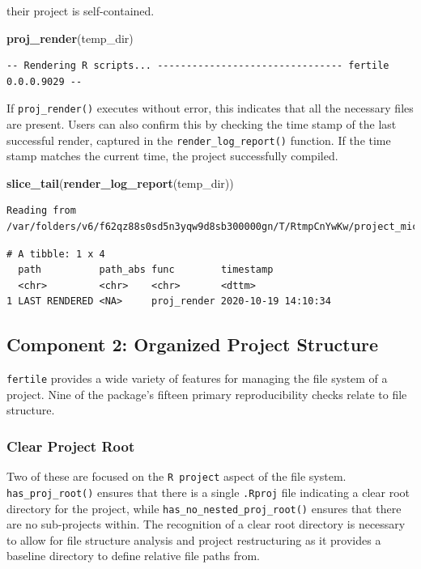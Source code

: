 \documentclass[12pt,twoside]{reedthesis}
\newenvironment{Shaded}{\begin{snugshade}}{\end{snugshade}}
\newcommand{\KeywordTok}[1]{\textcolor[rgb]{0.13,0.29,0.53}{\textbf{#1}}}
\newcommand{\NormalTok}[1]{#1}
\begin{document}
their project is self-contained.
\begin{Shaded}
\begin{Highlighting}[]
\KeywordTok{proj_render}\NormalTok{(temp_dir)}
\end{Highlighting}
\end{Shaded}
\begin{verbatim}
-- Rendering R scripts... -------------------------------- fertile 0.0.0.9029 --
\end{verbatim}
If \texttt{proj\_render()} executes without error, this indicates that
all the necessary files are present. Users can also confirm this by
checking the time stamp of the last successful render, captured in the
\texttt{render\_log\_report()} function. If the time stamp matches the
current time, the project successfully compiled.
\begin{Shaded}
\begin{Highlighting}[]
\KeywordTok{slice_tail}\NormalTok{(}\KeywordTok{render_log_report}\NormalTok{(temp_dir))}
\end{Highlighting}
\end{Shaded}
\begin{verbatim}
Reading from /var/folders/v6/f62qz88s0sd5n3yqw9d8sb300000gn/T/RtmpCnYwKw/project_miceps/.fertile_render_log.csv
\end{verbatim}
\begin{verbatim}
# A tibble: 1 x 4
  path          path_abs func        timestamp          
  <chr>         <chr>    <chr>       <dttm>             
1 LAST RENDERED <NA>     proj_render 2020-10-19 14:10:34
\end{verbatim}
\subsection{Component 2: Organized Project
Structure}\label{component-2-organized-project-structure}

\texttt{fertile} provides a wide variety of features for managing the
file system of a project. Nine of the package's fifteen primary
reproducibility checks relate to file structure.

\subsubsection{Clear Project Root}\label{clear-project-root}

Two of these are focused on the \texttt{R\ project} aspect of the file
system. \texttt{has\_proj\_root()} ensures that there is a single
\texttt{.Rproj} file indicating a clear root directory for the project,
while \texttt{has\_no\_nested\_proj\_root()} ensures that there are no
sub-projects within. The recognition of a clear root directory is
necessary to allow for file structure analysis and project restructuring
as it provides a baseline directory to define relative file paths from.
\end{document}
